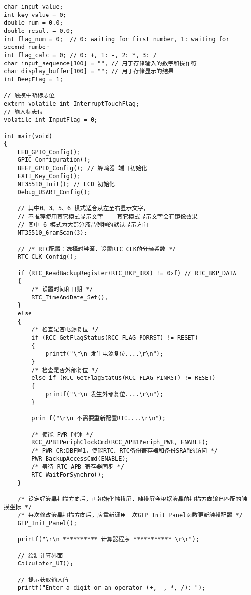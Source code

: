 \documentclass{course-thesis/theme-2639013-final}
\begin{document}
\begin{verbatim}
char input_value;
int key_value = 0;
double num = 0.0;
double result = 0.0;
int flag_num = 0;  // 0: waiting for first number, 1: waiting for second number
int flag_calc = 0; // 0: +, 1: -, 2: *, 3: /
char input_sequence[100] = ""; // 用于存储输入的数字和操作符
char display_buffer[100] = ""; // 用于存储显示的结果
int BeepFlag = 1;

// 触摸中断标志位
extern volatile int InterruptTouchFlag;
// 输入标志位
volatile int InputFlag = 0;

int main(void)
{
    LED_GPIO_Config();
    GPIO_Configuration();
    BEEP_GPIO_Config(); // 蜂鸣器 端口初始化
    EXTI_Key_Config();
    NT35510_Init(); // LCD 初始化
    Debug_USART_Config();

    // 其中0、3、5、6 模式适合从左至右显示文字，
    // 不推荐使用其它模式显示文字	其它模式显示文字会有镜像效果
    // 其中 6 模式为大部分液晶例程的默认显示方向
    NT35510_GramScan(3);

    // /* RTC配置：选择时钟源，设置RTC_CLK的分频系数 */
    RTC_CLK_Config();

    if (RTC_ReadBackupRegister(RTC_BKP_DRX) != 0xf) // RTC_BKP_DATA
    {
        /* 设置时间和日期 */
        RTC_TimeAndDate_Set();
    }
    else
    {
        /* 检查是否电源复位 */
        if (RCC_GetFlagStatus(RCC_FLAG_PORRST) != RESET)
        {
            printf("\r\n 发生电源复位....\r\n");
        }
        /* 检查是否外部复位 */
        else if (RCC_GetFlagStatus(RCC_FLAG_PINRST) != RESET)
        {
            printf("\r\n 发生外部复位....\r\n");
        }

        printf("\r\n 不需要重新配置RTC....\r\n");

        /* 使能 PWR 时钟 */
        RCC_APB1PeriphClockCmd(RCC_APB1Periph_PWR, ENABLE);
        /* PWR_CR:DBF置1，使能RTC、RTC备份寄存器和备份SRAM的访问 */
        PWR_BackupAccessCmd(ENABLE);
        /* 等待 RTC APB 寄存器同步 */
        RTC_WaitForSynchro();
    }

    /* 设定好液晶扫描方向后，再初始化触摸屏，触摸屏会根据液晶的扫描方向输出匹配的触摸坐标 */
    /* 每次修改液晶扫描方向后，应重新调用一次GTP_Init_Panel函数更新触摸配置 */
    GTP_Init_Panel();

    printf("\r\n ********** 计算器程序 *********** \r\n");

    // 绘制计算界面
    Calculator_UI();

    // 提示获取输入值
    printf("Enter a digit or an operator (+, -, *, /): ");


\end{verbatim}
\end{document}

